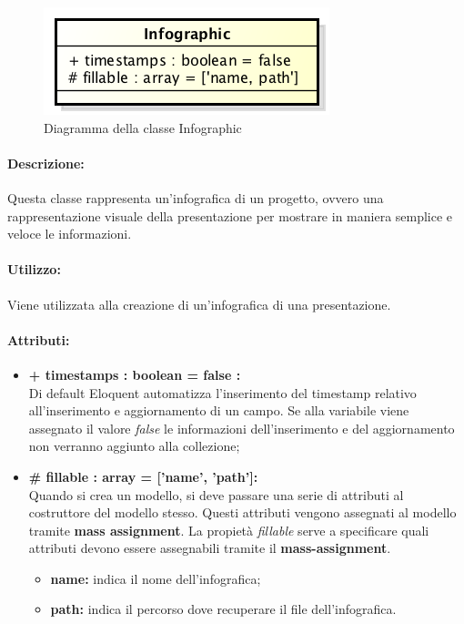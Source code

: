 	\begin{figure}[h]
		\centering
		\includegraphics[width=0.5\linewidth]{img/back_end_premi_model_infographic}
		\caption[Diagramma della classe Infographic]{Diagramma della classe Infographic}
		\label{fig:back_end_premi_model_infographic}
	\end{figure}


	\paragraph{Descrizione:}
	Questa classe rappresenta un’infografica di un progetto, ovvero una rappresentazione visuale della presentazione per mostrare in maniera semplice e veloce le informazioni.
	
	\paragraph{Utilizzo:}
	Viene utilizzata alla creazione di un’infografica di una presentazione.

	\paragraph{Attributi:}
		\begin{itemize}
			\item \textbf{+ timestamps : boolean = false :}\\
			Di default Eloquent automatizza l'inserimento del timestamp relativo all'inserimento e aggiornamento di un campo. Se alla variabile viene assegnato il valore \textit{false} le informazioni dell'inserimento e del aggiornamento non verranno aggiunto alla collezione;
			\item \textbf{\# fillable : array = [’name’, ’path’]:}\\
			Quando si crea un modello, si deve passare una serie di attributi al costruttore del modello stesso. Questi attributi vengono assegnati al modello tramite \textbf{mass assignment}. La propietà \textit{fillable} serve a specificare quali attributi devono essere assegnabili tramite il \textbf{mass-assignment}.
			\begin{itemize}
				\item \textbf{name:} indica il nome dell'infografica;
				\item \textbf{path:} indica il percorso dove recuperare il file dell'infografica.
			\end{itemize}
		\end{itemize}
\newpage


